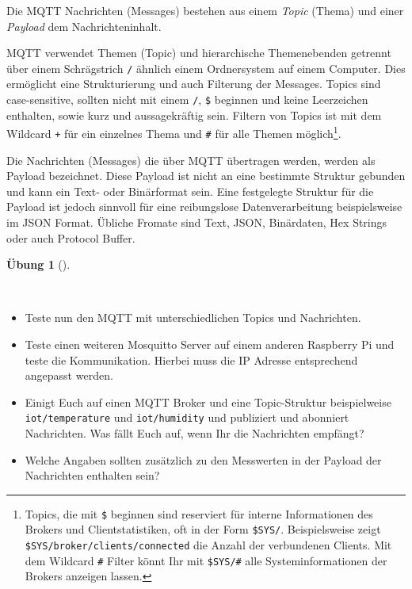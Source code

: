 \documentclass[
  11pt,
  a4paperpaper,
  oneside, openany  ,captions=tableheading
]{scrbook}
\providecommand{\tightlist}{%
  \setlength{\itemsep}{0pt}\setlength{\parskip}{0pt}}
\theoremstyle{definition}
\newtheorem{exercise}{Übung}[chapter]
\theoremstyle{remark}
\begin{document}
\begin{description}
\tightlist
\item[MQTT Message]
Die MQTT Nachrichten (Messages) bestehen aus einem \emph{Topic} (Thema)
und einer \emph{Payload} dem Nachrichteninhalt.
\item[MQTT Topics]
MQTT verwendet Themen (Topic) und hierarchische Themenebenden getrennt
über einem Schrägstrich \texttt{/} ähnlich einem Ordnersystem auf einem
Computer. Dies ermöglicht eine Strukturierung und auch Filterung der
Messages. Topics sind case-sensitive, sollten nicht mit einem
\texttt{/}, \texttt{\$} beginnen und keine Leerzeichen enthalten, sowie
kurz und aussagekräftig sein. Filtern von Topics ist mit dem Wildcard
\texttt{+} für ein einzelnes Thema und \texttt{\#} für alle Themen
möglich\footnote{Topics, die mit \texttt{\$} beginnen sind reserviert
  für interne Informationen des Brokers und Clientstatistiken, oft in
  der Form \texttt{\$SYS/}. Beispielsweise zeigt
  \texttt{\$SYS/broker/clients/connected} die Anzahl der verbundenen
  Clients. Mit dem Wildcard \texttt{\#} Filter könnt Ihr mit
  \texttt{\$SYS/\#} alle Systeminformationen der Brokers anzeigen
  lassen.}.
\item[MQTT Payload]
Die Nachrichten (Messages) die über MQTT übertragen werden, werden als
Payload bezeichnet. Diese Payload ist nicht an eine bestimmte Struktur
gebunden und kann ein Text- oder Binärformat sein. Eine festgelegte
Struktur für die Payload ist jedoch sinnvoll für eine reibungslose
Datenverarbeitung beispielsweise im JSON Format. Übliche Fromate sind
Text, JSON, Binärdaten, Hex Strings oder auch Protocol Buffer.
\end{description}

\begin{exercise}[]\protect\hypertarget{exr-mqtt}{}\label{exr-mqtt}

~

\begin{itemize}
\tightlist
\item
  Teste nun den MQTT mit unterschiedlichen Topics und Nachrichten.
\item
  Teste einen weiteren Mosquitto Server auf einem anderen Raspberry Pi
  und teste die Kommunikation. Hierbei muss die IP Adresse entsprechend
  angepasst werden.
\item
  Einigt Euch auf einen MQTT Broker und eine Topic-Struktur
  beispielweise \texttt{iot/temperature} und \texttt{iot/humidity} und
  publiziert und abonniert Nachrichten. Was fällt Euch auf, wenn Ihr die
  Nachrichten empfängt?
\item
  Welche Angaben sollten zusätzlich zu den Messwerten in der Payload der
  Nachrichten enthalten sein?
\end{itemize}

\end{exercise}
\end{document}
